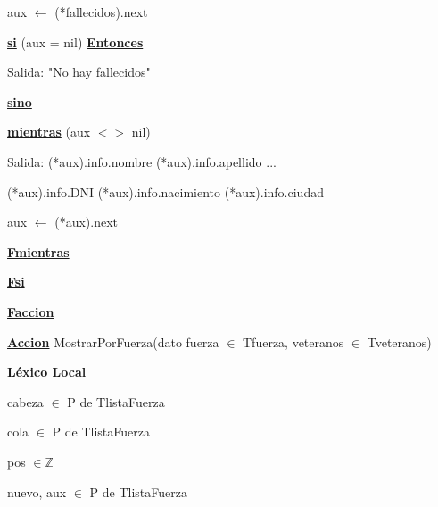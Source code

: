 \documentclass{article}
\begin{document}
            \hspace{12mm}aux $\leftarrow$ (*fallecidos).next

            \hspace{12mm}\underline{\textbf{si}} (aux = nil) \underline{\textbf{Entonces}}

                \hspace{16mm}Salida: "No hay fallecidos"

            \hspace{12mm}\underline{\textbf{sino}}
                
                \hspace{16mm}\underline{\textbf{mientras}} (aux $<>$ nil)

                    \hspace{20mm}Salida: (*aux).info.nombre (*aux).info.apellido ...

                        \hspace{28mm}(*aux).info.DNI (*aux).info.nacimiento (*aux).info.ciudad

                    \hspace{20mm}aux $\leftarrow$ (*aux).next

                \hspace{16mm}\underline{\textbf{Fmientras}}

            \hspace{12mm}\underline{\textbf{Fsi}}

    \hspace{4mm}\underline{\textbf{Faccion}}

    \vspace{4mm}

    \hspace{4mm}\underline{\textbf{Accion}} MostrarPorFuerza(dato fuerza $\in$ Tfuerza, veteranos $\in$ Tveteranos)

        \hspace{8mm}\underline{\textbf{Léxico Local}}

            \hspace{12mm}cabeza $\in$ P de TlistaFuerza

            \hspace{12mm}cola $\in$ P de TlistaFuerza

            \hspace{12mm}pos $\in \mathbb{Z}$

            \hspace{12mm}nuevo, aux $\in$ P de TlistaFuerza
\end{document}
